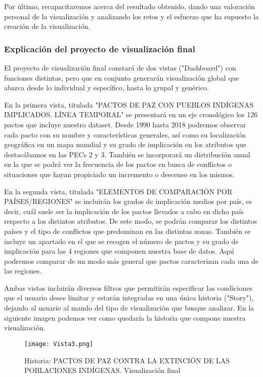 \documentclass[11pt]{article}
\begin{document}
Por último, recapacitaremos acerca del resultado obtenido, dando una valoración personal de la visualización y analizando los retos y el esfuerzo que ha supuesto la creación de la visualización. 

\subsubsection{Explicación del proyecto de visualización final}

El proyecto de visualización final constará de dos vistas ("Dashboard") con funciones distintas, pero que en conjunto generarán visualización global que abarca desde lo individual y específico, hasta lo grupal y genérico. 

En la primera vista, titulada "PACTOS DE PAZ CON PUEBLOS INDÍGENAS IMPLICADOS. LÍNEA TEMPORAL" se presentará en un eje cronológico los 126 pactos que incluye nuestro dataset. Desde 1990 hasta 2018 podremos observar cada pacto con su nombre y características generales, así como su localización geográfica en un mapa mundial y su grado de implicación en los atributos que destacábamos en las PECs 2 y 3. También se incorporará un distribución anual en la que se podrá ver la frecuencia de los pactos en busca de conflictos o situaciones que hayan propiciado un incremento o descenso en los mismos.

En la segunda vista, titulada "ELEMENTOS DE COMPARACIÓN POR PAÍSES/REGIONES" se incluirán los grados de implicación medios por país, es decir, cuál suele ser la implicación de los pactos llevados a cabo en dicho país respecto a los distintos atributos. De este modo, se podrán comparar los distintos países y el tipo de conflictos que predominan en las distintas zonas. También se incluye un apartado en el que se recogen el número de pactos y su grado de implicación para las 4 regiones que componen nuestra base de datos. Aquí podremos comparar de un modo más general que pactos caracterizan cada una de las regiones.

Ambas vistas incluirán diversos filtros que permitirán especificar las condiciones que el usuario desee limitar y estarán integradas en una única historia ("Story"), dejando al usuario al mando del tipo de visualización que busque analizar. En la siguiente imagen podemos ver como quedaría la historia que compone nuestra visualización.

\begin{figure}[h!]
    \caption{Historia: PACTOS DE PAZ CONTRA LA EXTINCIÓN DE LAS POBLACIONES INDÍGENAS. Visualización final}
\texttt{[image: Vista3.png]}
\end{figure}
\end{document}
